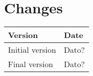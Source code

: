 \chapter{Changes}

\begin{tabular}{| l | l |}
	\hline
	\rowcolor[gray]{0.8}
	\textbf{Version} & \textbf{Date} \\
	\hline
		Initial version &		Dato? \\
		Final version &			Dato? \\
    \hline
\end{tabular}